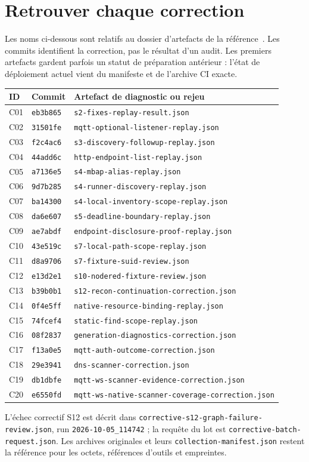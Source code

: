 \documentclass[11pt,a4paper]{article}
\newcommand{\code}[1]{{\urlstyle{tt}\nolinkurl{#1}}}
\begin{document}
\appendix
\section{Retrouver chaque correction}
Les noms ci-dessous sont relatifs au dossier d'artefacts de la référence~\cite{artefacts}. Les commits identifient la correction, pas le résultat d'un audit. Les premiers artefacts gardent parfois un statut de préparation antérieur : l'état de déploiement actuel vient du manifeste et de l'archive CI exacte.
\small
\begin{longtable}{@{}p{9mm}p{23mm}p{117mm}@{}}
\toprule
ID & Commit & Artefact de diagnostic ou rejeu \\
\midrule\endhead
C01 & \code{eb3b865} & \code{s2-fixes-replay-result.json} \\
C02 & \code{31501fe} & \code{mqtt-optional-listener-replay.json} \\
C03 & \code{f2c4ac6} & \code{s3-discovery-followup-replay.json} \\
C04 & \code{44add6c} & \code{http-endpoint-list-replay.json} \\
C05 & \code{a7136e5} & \code{s4-mbap-alias-replay.json} \\
C06 & \code{9d7b285} & \code{s4-runner-discovery-replay.json} \\
C07 & \code{ba14300} & \code{s4-local-inventory-scope-replay.json} \\
C08 & \code{da6e607} & \code{s5-deadline-boundary-replay.json} \\
C09 & \code{ae7abdf} & \code{endpoint-disclosure-proof-replay.json} \\
C10 & \code{43e519c} & \code{s7-local-path-scope-replay.json} \\
C11 & \code{d8a9706} & \code{s7-fixture-suid-review.json} \\
C12 & \code{e13d2e1} & \code{s10-nodered-fixture-review.json} \\
C13 & \code{b39b0b1} & \code{s12-recon-continuation-correction.json} \\
C14 & \code{0f4e5ff} & \code{native-resource-binding-replay.json} \\
C15 & \code{74fcef4} & \code{static-find-scope-replay.json} \\
C16 & \code{08f2837} & \code{generation-diagnostics-correction.json} \\
C17 & \code{f13a0e5} & \code{mqtt-auth-outcome-correction.json} \\
C18 & \code{29e3941} & \code{dns-scanner-correction.json} \\
C19 & \code{db1dbfe} & \code{mqtt-ws-scanner-evidence-correction.json} \\
C20 & \code{e6550fd} & \code{mqtt-ws-native-scanner-coverage-correction.json} \\
\bottomrule
\end{longtable}
\normalsize
L'échec correctif S12 est décrit dans \code{corrective-s12-graph-failure-review.json}, run \code{2026-10-05_114742} ; la requête du lot est \code{corrective-batch-request.json}. Les archives originales et leurs \code{collection-manifest.json} restent la référence pour les octets, références d'outils et empreintes.
\end{document}
